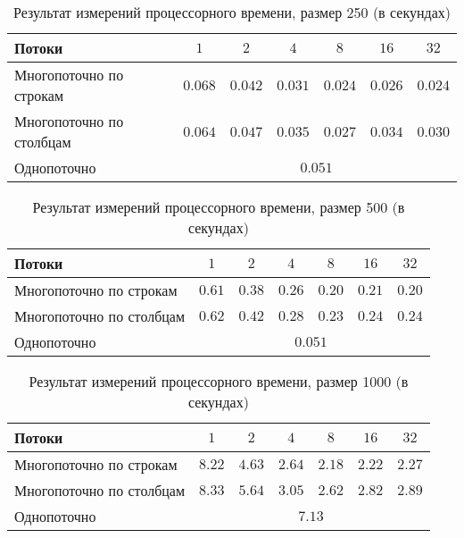 \begin{table}[h] \label{table_4_3}
	\caption{Результат измерений процессорного времени, размер 250 (в секундах)}
	\begin{tabular}{| p{5.0cm} | c | c | c | c | c | c |}
		\hline
		Потоки						&$1$		&$2$		&$4$		&$8$		&$16$		&$32$	\\
		\hline\hline
		Многопоточно по строкам		&$0.068$	&$0.042$	&$0.031$	&$0.024$	&$0.026$	&$0.024$\\
		\hline
		Многопоточно по столбцам	&$0.064$	&$0.047$	&$0.035$	&$0.027$	&$0.034$	&$0.030$\\
		\hline
		Однопоточно					&\multicolumn{6}{|c|}{$0.051$}										\\
		\hline
	\end{tabular}
\end{table}

\begin{table}[h] \label{table_4_4}
	\caption{Результат измерений процессорного времени, размер 500 (в секундах)}
	\begin{tabular}{| p{5.0cm} | c | c | c | c | c | c |}
		\hline
		Потоки						&$1$	&$2$	&$4$	&$8$	&$16$	&$32$	\\
		\hline\hline
		Многопоточно по строкам		&$0.61$	&$0.38$	&$0.26$	&$0.20$	&$0.21$	&$0.20$\\
		\hline
		Многопоточно по столбцам	&$0.62$	&$0.42$	&$0.28$	&$0.23$	&$0.24$	&$0.24$\\
		\hline
		Однопоточно					&\multicolumn{6}{|c|}{$0.051$}										\\
		\hline
	\end{tabular}
\end{table}

\begin{table}[!h] \label{table_4_5}
	\caption{Результат измерений процессорного времени, размер 1000 (в секундах)}
	\begin{tabular}{| p{5.0cm} | c | c | c | c | c | c |}
		\hline
		Потоки						&$1$	&$2$	&$4$	&$8$	&$16$	&$32$	\\
		\hline\hline
		Многопоточно по строкам		&$8.22$	&$4.63$	&$2.64$	&$2.18$	&$2.22$	&$2.27$	\\
		\hline
		Многопоточно по столбцам	&$8.33$	&$5.64$	&$3.05$	&$2.62$	&$2.82$	&$2.89$	\\
		\hline
		Однопоточно					&\multicolumn{6}{|c|}{$7.13$}					\\
		\hline
	\end{tabular}
\end{table}

